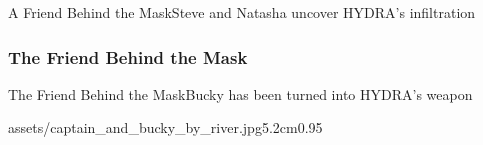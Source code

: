 \begin{frame}{A Friend Behind the Mask}{Steve and Natasha uncover HYDRA's infiltration}
    \begin{SlidePhotoPair}
        \hfill
        \caption{The allies uncover a conspiracy within S.H.I.E.L.D.}
    \end{SlidePhotoPair}
\end{frame}

\subsubsection{The Friend Behind the Mask}
\begin{frame}{The Friend Behind the Mask}{Bucky has been turned into HYDRA's weapon}
    \begin{SlideTitlePhoto}{assets/captain_and_bucky_by_river.jpg}{5.2cm}{0.95\linewidth}
        \caption{Steve refuses to give up on Bucky.}
    \end{SlideTitlePhoto}
\end{frame}

